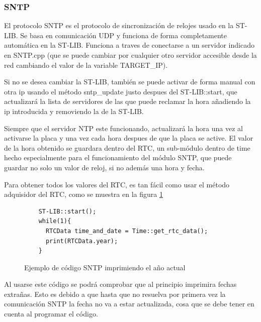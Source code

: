 \documentclass{report}
\begin{document}
\subsubsection{SNTP}
El protocolo SNTP es el protocolo de sincronización de relojes usado en la ST-LIB. Se basa en comunicación UDP y funciona de forma completamente automática en la ST-LIB. Funciona a traves de conectarse a un servidor indicado en SNTP.cpp (que se puede cambiar por cualquier otro servidor accesible desde la red cambiando el valor de la variable TARGET\_IP). \par 
Si no se desea cambiar la ST-LIB, también se puede activar de forma manual con otra ip usando el método sntp\_update justo despues del ST-LIB::start, que actualizará la lista de servidores de las que puede reclamar la hora añadiendo la ip introducida y removiendo la de la ST-LIB. 
\par \vspace{0.3cm}
Siempre que el servidor NTP este funcionando, actualizará la hora una vez al activarse la placa y una vez cada hora despues de que la placa se active. El valor de la hora obtenido se guardara dentro del RTC, un sub-módulo dentro de time hecho especialmente para el funcionamiento del módulo SNTP, que puede guardar no solo un valor de reloj, si no además una hora y fecha. 
\par \vspace{0.3cm}
Para obtener todos los valores del RTC, es tan fácil como usar el método adquisidor del RTC, como se muestra en la figura \ref{SNTPCode}

\begin{figure}[H]
  \begin{lstlisting}
    ST-LIB::start();
    while(1){
      RTCData time_and_date = Time::get_rtc_data();
      print(RTCData.year);
    }
  \end{lstlisting}
  \caption{Ejemplo de código SNTP imprimiendo el año actual}
  \label{SNTPCode}
\end{figure}
\par \vspace{0.3cm}
Al usarse este código se podrá comprobar que al principio imprimira fechas extrañas. Esto es debido a que hasta que no resuelva por primera vez la comunicación SNTP la fecha no va a estar actualizada, cosa que se debe tener en cuenta al programar el código. 

\newpage
\end{document}
